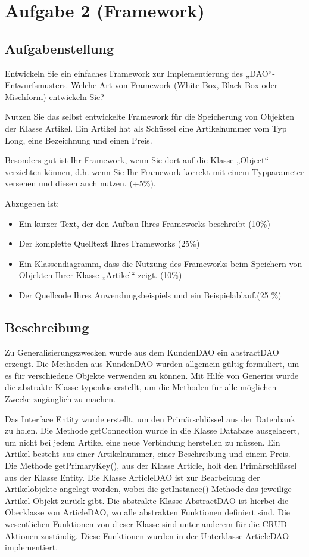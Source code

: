 \section{Aufgabe 2 (Framework)}
\subsection{Aufgabenstellung}
Entwickeln Sie ein einfaches Framework zur Implementierung des „DAO“-Entwurfsmusters.
Welche Art von Framework (White Box, Black Box oder Mischform) entwickeln Sie?

Nutzen Sie das selbst entwickelte Framework für die Speicherung von Objekten der Klasse
Artikel. Ein Artikel hat als Schüssel eine Artikelnummer vom Typ Long, eine Bezeichnung
und einen Preis.

Besonders gut ist Ihr Framework, wenn Sie dort auf die Klasse „Object“ verzichten können,
d.h. wenn Sie Ihr Framework korrekt mit einem Typparameter versehen und diesen auch
nutzen. (+5\%).

Abzugeben ist:
\begin{itemize}
  \item Ein kurzer Text, der den Aufbau Ihres Frameworks beschreibt (10\%)
  \item Der komplette Quelltext Ihres Frameworks (25\%)
  \item Ein Klassendiagramm, dass die Nutzung des Frameworks beim Speichern von
Objekten Ihrer Klasse „Artikel“ zeigt. (10\%)
  \item Der Quellcode Ihres Anwendungsbeispiels und ein Beispielablauf.(25 \%)
\end{itemize}

\subsection{Beschreibung}
Zu Generalisierungszwecken wurde aus dem KundenDAO ein
abstractDAO erzeugt. Die Methoden aus KundenDAO wurden allgemein gültig
formuliert, um es für verschiedene Objekte verwenden zu können. Mit Hilfe von
Generics wurde die abstrakte Klasse typenlos erstellt, um die Methoden für alle
möglichen Zwecke zugänglich zu machen. 

Das Interface Entity wurde erstellt, um den Primärschlüssel aus der Datenbank zu
holen. Die Methode getConnection wurde in die Klasse Database ausgelagert, um
nicht bei jedem Artikel eine neue Verbindung herstellen zu müssen. Ein Artikel
besteht aus einer Artikelnummer, einer Beschreibung und einem Preis. Die Methode
getPrimaryKey(), aus der Klasse Article, holt den Primärschlüssel aus der Klasse
Entity. Die Klasse ArticleDAO ist zur Bearbeitung der Artikelobjekte angelegt
worden, wobei die getInstance() Methode das jeweilige Artikel-Objekt zurück
gibt. Die abstrakte Klasse AbstractDAO ist hierbei die Oberklasse von
ArticleDAO, wo alle abstrakten Funktionen definiert sind. Die wesentlichen
Funktionen von dieser Klasse sind unter anderem für die CRUD-Aktionen zuständig.
Diese Funktionen wurden in der Unterklasse ArticleDAO implementiert.

